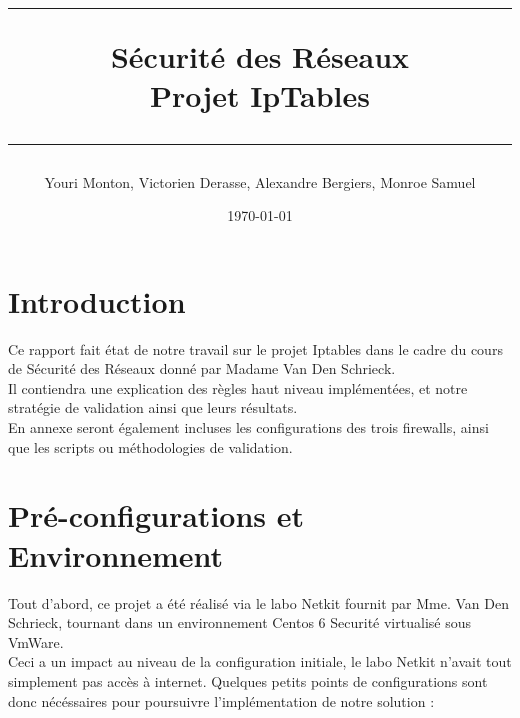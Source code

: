 \documentclass[a4paper,10pt,final,fleqn]{article}
\title{
\parbox{15cm}
{ %
  \vspace{3cm}
	\begin{center}\sf\bfseries\Huge
		\rule{15cm}{1pt}
		\medskip
		Sécurité des Réseaux \\
		\huge Projet IpTables
		\vspace{.5cm}
		\rule{15cm}{1pt}
	\end{center}
	\vspace{3cm}
 }}
\author{Youri Monton, Victorien Derasse, Alexandre Bergiers, Monroe Samuel}
\date{\today}
\begin{document}
\maketitle
\newpage
\thispagestyle{empty}
\mbox{}

\section{Introduction}

	Ce rapport fait état de notre travail sur le projet Iptables dans le cadre du cours de Sécurité des Réseaux donné par Madame Van Den Schrieck.\\

	Il contiendra une explication des règles haut niveau implémentées, et notre stratégie de validation ainsi que leurs résultats.\\
	En annexe seront également incluses les configurations des trois firewalls, ainsi que les scripts ou méthodologies de validation.\\

\section{Pré-configurations et Environnement}

	Tout d'abord, ce projet a été réalisé via le labo Netkit fournit par Mme. Van Den Schrieck, tournant dans un environnement Centos 6 Securité virtualisé sous VmWare.\\

	Ceci a un impact au niveau de la configuration initiale, le labo Netkit n'avait tout simplement pas accès à internet. Quelques petits points de configurations sont donc nécéssaires pour poursuivre l'implémentation de notre solution : \\
\end{document}
